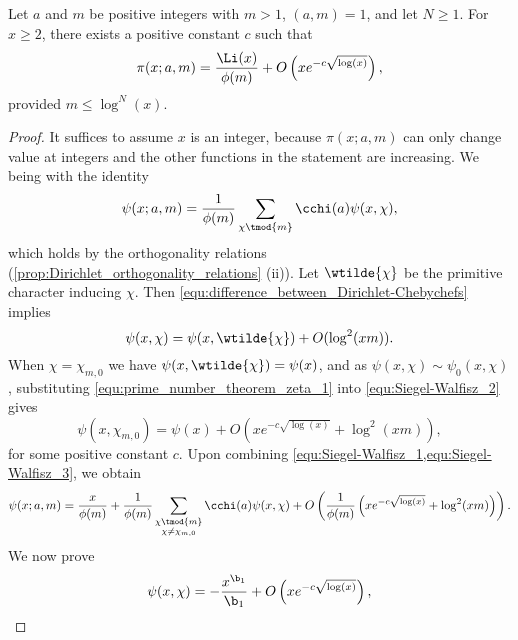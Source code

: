       \begin{theorem}
        Let $a$ and $m$ be positive integers with $m > 1$, $(a,m) = 1$, and let $N \ge 1$. For $x \ge 2$, there exists a positive constant $c$ such that
        \[
          \pi(x;a,m) = \frac{\Li(x)}{\phi(m)}+O\left(xe^{-c\sqrt{\log(x)}}\right),
        \]
        provided $m \le \log^{N}(x)$.
      \end{theorem}
      \begin{proof}
        It suffices to assume $x$ is an integer, because $\pi(x;a,m)$ can only change value at integers and the other functions in the statement are increasing. We being with the identity
        \begin{equation}\label{equ:Siegel-Walfisz_1}
          \psi(x;a,m) = \frac{1}{\phi(m)}\sum_{\chi \tmod{m}}\cchi(a)\psi(x,\chi),
        \end{equation}
        which holds by the orthogonality relations (\cref{prop:Dirichlet_orthogonality_relations} (ii)). Let $\wtilde{\chi}$ be the primitive character inducing $\chi$. Then \cref{equ:difference_between_Dirichlet-Chebychefs} implies
        \begin{equation}\label{equ:Siegel-Walfisz_2}
          \psi(x,\chi) = \psi(x,\wtilde{\chi})+O(\log^{2}(xm)).
        \end{equation}
        When $\chi = \chi_{m,0}$ we have $\psi(x,\wtilde{\chi}) = \psi(x)$, and as $\psi(x,\chi) \sim \psi_{0}(x,\chi)$, substituting \cref{equ:prime_number_theorem_zeta_1} into \cref{equ:Siegel-Walfisz_2} gives
        \begin{equation}\label{equ:Siegel-Walfisz_3}
          \psi(x,\chi_{m,0}) = \psi(x)+O\left(xe^{-c\sqrt{\log(x)}}+\log^{2}(xm)\right),
        \end{equation}
        for some positive constant $c$. Upon combining \cref{equ:Siegel-Walfisz_1,equ:Siegel-Walfisz_3}, we obtain
        \begin{equation}\label{equ:Siegel-Walfisz_4}
          \psi(x;a,m) = \frac{x}{\phi(m)}+\frac{1}{\phi(m)}\sum_{\substack{\chi \tmod{m} \\ \chi \neq \chi_{m,0}}}\cchi(a)\psi(x,\chi)+O\left(\frac{1}{\phi(m)}\left(xe^{-c\sqrt{\log(x)}}+\log^{2}(xm)\right)\right).
        \end{equation}
        We now prove
        \begin{equation}\label{equ:Siegel-Walfisz_5}
          \psi(x,\chi) = -\frac{x^{\b_{1}}}{\b_{1}}+O\left(xe^{-c\sqrt{\log(x)}}\right),
        \end{equation}

\end{proof}
